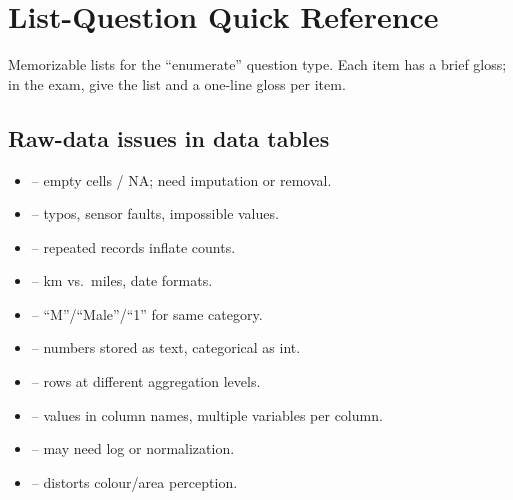 \section{List-Question Quick Reference}
\label{sec:lists}

Memorizable lists for the ``enumerate'' question type. Each item has a brief
gloss; in the exam, give the list and a one-line gloss per item.

\subsection{Raw-data issues in data tables}
\begin{itemize}[leftmargin=1.4em]
  \item {} -- empty cells / NA; need imputation or removal.
  \item {} -- typos, sensor faults, impossible values.
  \item {} -- repeated records inflate counts.
  \item {} -- km vs.\ miles, date formats.
  \item {} -- ``M''/``Male''/``1'' for same category.
  \item {} -- numbers stored as text, categorical as int.
  \item {} -- rows at different aggregation levels.
  \item {} -- values in column names, multiple variables
        per column.
  \item {} -- may need log or
        normalization.
  \item {} -- distorts colour/area perception.
\end{itemize}

